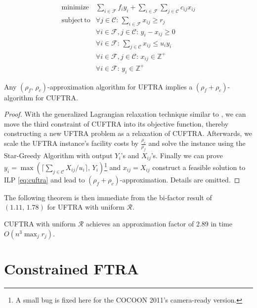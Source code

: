 \documentclass[10pt]{llncs}
\begin{document}
{\small \begin{equation}
\begin{array}{llc}
\mathrm{minimize} & \sum_{i\in\mathcal{F}}f_{i}y_{i}+\sum_{i\in\mathcal{F}}\sum_{j\in\mathcal{C}}c_{ij}x_{ij}\\
\mathrm{subject\, to} & \forall j\in\mathcal{C}:\,\sum_{i\in\mathcal{F}}x_{ij}\ge r_{j}\\
 & \forall i\in\mathcal{F},j\in\mathcal{C}:\, y_{i}-x_{ij}\geq0\\
 & \forall i\in\mathcal{F}:\,\sum_{j\in\mathcal{C}}x_{ij}\leq u_{i}y_{i}\\
 & \forall i\in\mathcal{F},j\in\mathcal{C}:\, x_{ij}\in\mathbb{Z}^{+}\\
 & \forall i\in\mathcal{F}:\, y_{i}\in\mathbb{Z}^{+}\end{array}\label{eq:cuftra}\end{equation}
}{\small \par}
\begin{theorem}
Any $\left(\rho_{f},\,\rho_{c}\right)$-approximation algorithm for
UFTRA implies a $\left(\rho_{f}+\rho_{c}\right)$-algorithm for CUFTRA.\end{theorem}
\begin{proof}
With the generalized Lagrangian relaxation technique similar to \cite{Mahdian021.52},
we can move the third constraint of CUFTRA into its objective function,
thereby constructing a new UFTRA problem as a relaxation of CUFTRA.
Afterwards, we scale the UFTRA instance's facility costs by $\frac{\rho_{c}}{\rho_{f}}$
and solve the instance using the Star-Greedy Algorithm with output
$Y_{i}$'s and $X_{ij}$'s. Finally we can prove $y_{i}=\max\left(\lceil\sum_{j\in\mathcal{C}}X_{ij}/u_{i}\rceil,\, Y_{i}\right)$\footnote{A small bug is fixed here for the COCOON 2011's camera-ready version.} and $x_{ij}=X_{ij}$ construct a feasible solution to ILP \eqref{eq:cuftra}
and lead to $\left(\rho_{f}+\rho_{c}\right)$-approximation. Details
are omitted.
\end{proof}
The following theorem is then immediate from the bi-factor result
of $\left(1.11,\,1.78\right)$ for UFTRA with uniform $\mathcal{R}$.
\begin{theorem}
CUFTRA with uniform $\mathcal{R}$ achieves an approximation factor
of 2.89 in time $O\left(n^{3}\max_{j}r_{j}\right)$.
\end{theorem}

\section{Constrained FTRA }
\end{document}
